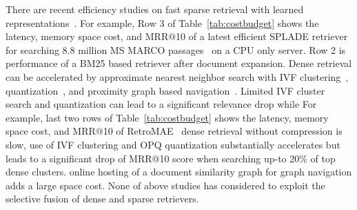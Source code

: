 There are recent efficiency studies on
fast  sparse retrieval with learned
representations~\cite{Lassance2022SPLADE-efficient,mallia2022faster,qiao2023optimizing,2023SIGIR-Qiao, 2023SIGIR-SPLADE-pruning}.
For example, Row 3 of Table~\ref{tab:costbudget} shows the latency, memory space cost, and  MRR@10  of
a latest efficient SPLADE retriever for searching 8.8 million
MS MARCO passages~\cite{2023SIGIR-Qiao} on a CPU only server.
Row 2 is performance of a BM25 based retriever after document expansion. 
Dense retrieval can be accelerated  by approximate nearest neighbor  search with 
IVF clustering~\cite{johnson2019billion, 2021Facebook-DrBoost-Lewis}, quantization~\cite{2021CIKM-JPQ-Zhan,  2022WSDM-Zhan-RepCONC, Xiao2022Distill-VQ},
and  proximity graph based navigation~\cite{2020TPAMI-HNSW,2022CIKM-MacAvaneyGraphReRank,2023SIGIR-LADR}. 
Limited IVF cluster search and quantization can lead to  a significant  relevance drop while 
For example, last two rows of Table~\ref{tab:costbudget} shows the latency, memory space cost, and  MRR@10  of
RetroMAE~\cite{Liu2022RetroMAE} dense retrieval without compression is slow, use of
IVF clustering and OPQ quantization substantially accelerates but leads to a significant drop  of   MRR@10 score when searching up-to 20\%  
of top dense clusters. 
online hosting of a document similarity graph  for graph navigation adds a large space cost.
None of above studies has considered to exploit the selective fusion of dense and sparse  retrievers. 

\begin{table}[htbp]
        \centering      
\caption{Latency and space cost of sampled sparse and dense models for MS MARCO passages with Dev query  set}
\label{tab:costbudget}
\end{table}


